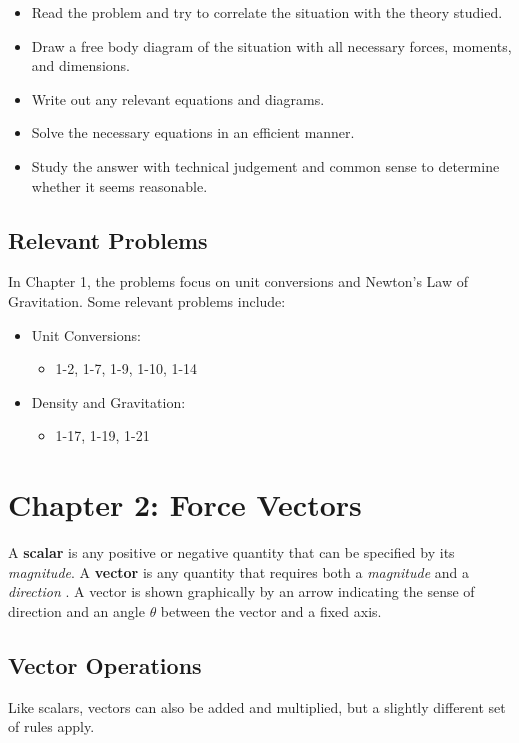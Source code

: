 \documentclass[12pt]{article}
\begin{document}
\begin{itemize}
    \item Read the problem and try to correlate the situation with the theory studied.
    \item Draw a free body diagram of the situation with all necessary forces, moments, and dimensions.
    \item Write out any relevant equations and diagrams.
    \item Solve the necessary equations in an efficient manner.
    \item Study the answer with technical judgement and common sense to determine whether it seems reasonable.
\end{itemize}

\subsection{Relevant Problems}
In Chapter 1, the problems focus on unit conversions and Newton's Law of Gravitation.
Some relevant problems include:

\begin{itemize}
    \item Unit Conversions:
    \begin{itemize}
        \item 1-2, 1-7, 1-9, 1-10, 1-14
    \end{itemize}
    \item Density and Gravitation:
    \begin{itemize}
        \item 1-17, 1-19, 1-21
    \end{itemize}
\end{itemize}

\pagebreak
\section{Chapter 2: Force Vectors}
A \textbf{scalar} is any positive or negative quantity that can be specified by its \textit{magnitude}.
A \textbf{vector} is any quantity that requires both a \textit{magnitude} and a \textit{direction} \cite{buckham}.
A vector is shown graphically by an arrow indicating the sense of direction and an angle $\theta$ between the vector and a fixed axis.

\subsection{Vector Operations}
Like scalars, vectors can also be added and multiplied, but a slightly different set of rules apply.
\end{document}
